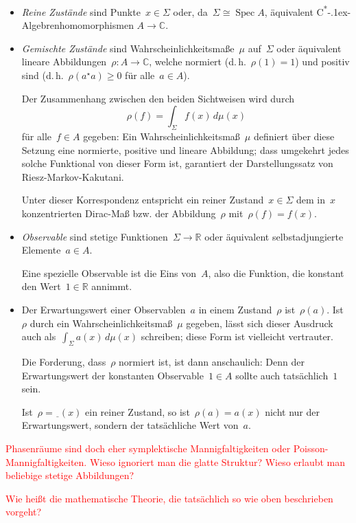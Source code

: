 \documentclass[a4paper,ngerman,12pt]{scrartcl}
\theoremstyle{definition}
\theoremstyle{plain}
\theoremstyle{remark}
\newcommand{\RR}{\mathbb{R}}
\newcommand{\CC}{\mathbb{C}}
\newcommand{\freist}{\underline{\ \ }}
\newcommand{\csalgebren}{C\textsuperscript{*}\kern-.1ex-Alge\-bren}
\DeclareMathOperator{\Spec}{Spec}
\renewcommand{\_}{\mathpunct{.}\,}
\newcommand{\?}{\,{:}\,}
\newcommand{\XXX}[1]{\textcolor{red}{#1}}
\begin{document}
\begin{itemize}
\item \emph{Reine Zustände} sind Punkte~$x \in \Sigma$ oder, da~$\Sigma \cong \Spec
A$, äquivalent \csalgebren{}\-ho\-mo\-mor\-phis\-men $A \to \CC$.

\item \emph{Gemischte Zustände} sind Wahrscheinlichkeitsmaße~$\mu$ auf~$\Sigma$ oder
äquivalent lineare Abbildungen~$\rho : A \to \CC$, welche normiert
(d.\,h.~$\rho(1) = 1$) und positiv sind (d.\,h.~$\rho(a^\star a) \geq 0$
für alle~$a \in A$).

Der Zusammenhang zwischen den beiden Sichtweisen wird durch
\[ \rho(f) = \int_\Sigma f(x) \,d\mu(x) \]
für alle~$f \in A$ gegeben: Ein Wahrscheinlichkeitsmaß~$\mu$ definiert über
diese Setzung eine normierte, positive und lineare Abbildung; dass umgekehrt
jedes solche Funktional von dieser Form ist, garantiert der Darstellungssatz
von Riesz-Markov-Kakutani.

Unter dieser Korrespondenz entspricht ein reiner Zustand~$x \in \Sigma$ dem
in~$x$ konzentrierten Dirac-Maß bzw. der Abbildung~$\rho$ mit~$\rho(f) =
f(x)$.

\item \emph{Observable} sind stetige Funktionen~$\Sigma \to \RR$ oder
äquivalent selbstadjungierte Elemente~$a \in A$.

Eine spezielle Observable ist die Eins von~$A$, also die Funktion, die konstant
den Wert~$1 \in \RR$ annimmt.

\item Der Erwartungswert einer Observablen~$a$ in einem Zustand~$\rho$
ist~$\rho(a)$. Ist~$\rho$ durch ein Wahrscheinlichkeitsmaß~$\mu$ gegeben,
lässt sich dieser Ausdruck auch als~$\int_\Sigma a(x) \,d\mu(x)$ schreiben;
diese Form ist vielleicht vertrauter.

Die Forderung, dass~$\rho$ normiert ist, ist dann anschaulich: Denn der
Erwartungswert der konstanten Observable~$1 \in A$ sollte auch tatsächlich~$1$
sein.

Ist~$\rho = \freist(x)$ ein reiner Zustand, so ist~$\rho(a) = a(x)$ nicht nur
der Erwartungswert, sondern der tatsächliche Wert von~$a$.
\end{itemize}

\XXX{Phasenräume sind doch eher symplektische Mannigfaltigkeiten oder
Pois\-son-Man\-nig\-fal\-tig\-kei\-ten. Wieso ignoriert man die glatte
Struktur? Wieso erlaubt man beliebige stetige Abbildungen?}

\XXX{Wie heißt die mathematische Theorie, die tatsächlich so wie oben
beschrieben vorgeht?}
\end{document}
